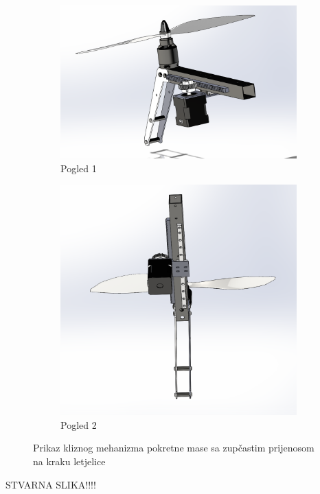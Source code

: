 \documentclass[11pt,a4paper]{article}
\begin{document}
\begin{figure}[H]
\centering
\begin{subfigure}{.5\textwidth}
  \centering
  \includegraphics[width=.9\linewidth]{figures/arm_assembly1.png}
  \caption{Pogled 1}
  \label{fig:sub1}
\end{subfigure}%
\begin{subfigure}{.5\textwidth}
  \centering
  \includegraphics[width=.9\linewidth]{figures/arm_assembly2.png}
  \caption{Pogled 2}
  \label{fig:sub2}
\end{subfigure}
\caption{Prikaz kliznog mehanizma pokretne mase sa zupčastim prijenosom na kraku letjelice}
\label{fig:arm_assembly}
\end{figure}


STVARNA SLIKA!!!!
\end{document}
